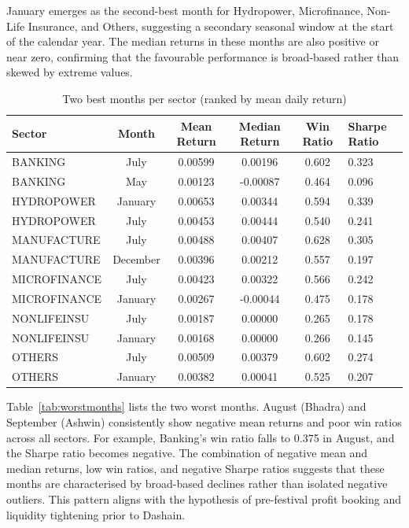 \documentclass[12pt,a4paper,fleqn]{article}
\begin{document}
January emerges as the second-best month for Hydropower, Microfinance, Non-Life Insurance, and Others, suggesting a secondary seasonal window at the start of the calendar year. The median returns in these months are also positive or near zero, confirming that the favourable performance is broad-based rather than skewed by extreme values.

\begin{table}[ht]
\centering
\caption{Two best months per sector (ranked by mean daily return)}
\label{tab:bestmonths}
\begin{tabular}{lcccc}
\toprule
Sector & Month & Mean Return & Median Return & Win Ratio & Sharpe Ratio \\
\midrule
BANKING       & July    & 0.00599 & 0.00196 & 0.602 & 0.323 \\
BANKING       & May     & 0.00123 & -0.00087 & 0.464 & 0.096 \\
\addlinespace
HYDROPOWER    & January & 0.00653 & 0.00344 & 0.594 & 0.339 \\
HYDROPOWER    & July    & 0.00453 & 0.00444 & 0.540 & 0.241 \\
\addlinespace
MANUFACTURE   & July    & 0.00488 & 0.00407 & 0.628 & 0.305 \\
MANUFACTURE   & December & 0.00396 & 0.00212 & 0.557 & 0.197 \\
\addlinespace
MICROFINANCE  & July    & 0.00423 & 0.00322 & 0.566 & 0.242 \\
MICROFINANCE  & January & 0.00267 & -0.00044 & 0.475 & 0.178 \\
\addlinespace
NONLIFEINSU   & July    & 0.00187 & 0.00000 & 0.265 & 0.178 \\
NONLIFEINSU   & January & 0.00168 & 0.00000 & 0.266 & 0.145 \\
\addlinespace
OTHERS        & July    & 0.00509 & 0.00379 & 0.602 & 0.274 \\
OTHERS        & January & 0.00382 & 0.00041 & 0.525 & 0.207 \\
\bottomrule
\end{tabular}
\end{table}

Table~\ref{tab:worstmonths} lists the two worst months. August (Bhadra) and September (Ashwin) consistently show negative mean returns and poor win ratios across all sectors. For example, Banking's win ratio falls to 0.375 in August, and the Sharpe ratio becomes negative. The combination of negative mean and median returns, low win ratios, and negative Sharpe ratios suggests that these months are characterised by broad-based declines rather than isolated negative outliers. This pattern aligns with the hypothesis of pre-festival profit booking and liquidity tightening prior to Dashain.
\end{document}
